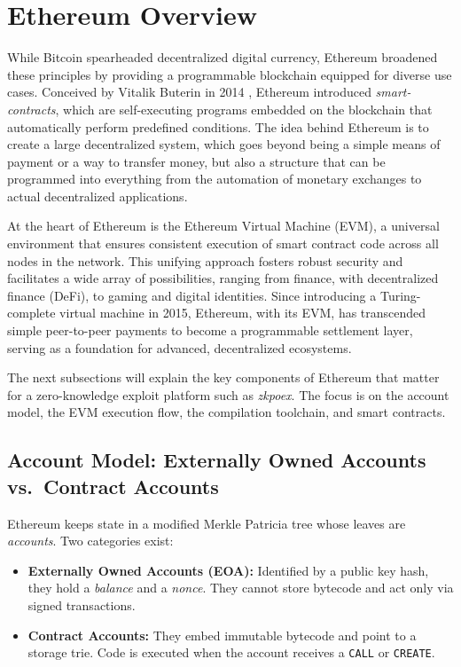 \section{Ethereum Overview}\label{ethOverview}

While Bitcoin spearheaded decentralized digital currency, Ethereum broadened these principles by providing a programmable blockchain equipped for diverse use cases. Conceived by Vitalik Buterin in 2014 \cite{ethereum}, Ethereum introduced \textit{smart-contracts}, which are self-executing programs embedded on the blockchain that automatically perform predefined conditions. The idea behind Ethereum is to create a large decentralized system, which goes beyond being a simple means of payment or a way to transfer money, but also a structure that can be programmed into everything from the automation of monetary exchanges to actual decentralized applications.

At the heart of Ethereum is the Ethereum Virtual Machine (EVM), a universal environment that ensures consistent execution of smart contract code across all nodes in the network. This unifying approach fosters robust security and facilitates a wide array of possibilities, ranging from finance, with decentralized finance (DeFi), to gaming and digital identities. Since introducing a Turing-complete virtual machine in 2015, Ethereum, with its EVM, has transcended simple peer-to-peer payments to become a programmable settlement layer, serving as a foundation for advanced, decentralized ecosystems.

The next subsections will explain the key components of Ethereum that matter for a zero-knowledge exploit platform such as \textit{zkpoex}.  The focus is on the account model, the EVM execution flow, the compilation toolchain, and smart contracts.

\subsection{Account Model: Externally Owned Accounts vs.\ Contract Accounts}\label{subsec:accounts}

Ethereum keeps state in a modified Merkle Patricia tree whose leaves are \textit{accounts}.  
Two categories exist:

\begin{itemize}
  \item \textbf{Externally Owned Accounts (EOA):}  Identified by a public key hash, they hold a \textit{balance} and a \textit{nonce}.  They cannot store bytecode and act only via signed transactions.
  \item \textbf{Contract Accounts:}  They embed immutable bytecode and point to a storage trie.  Code is executed when the account receives a \texttt{CALL} or \texttt{CREATE}.  
\end{itemize}

